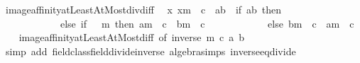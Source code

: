 \begin{isabellebody}
\endisatagproof
{\isafoldproof}%
%
\isadelimproof
\isanewline
%
\endisadelimproof
\isanewline
{}\isamarkupfalse%
\ image{\isacharunderscore}{\kern0pt}affinity{\isacharunderscore}{\kern0pt}atLeastAtMost{\isacharunderscore}{\kern0pt}div{\isacharunderscore}{\kern0pt}diff{\isacharcolon}{\kern0pt}\isanewline
\ \ {\isachardoublequoteopen}{\isacharparenleft}{\kern0pt}{\isacharparenleft}{\kern0pt}{\isasymlambda}x{\isachardot}{\kern0pt}\ x{\isacharslash}{\kern0pt}m\ {\isacharminus}{\kern0pt}\ c{\isacharparenright}{\kern0pt}\ {\isacharbackquote}{\kern0pt}\ {\isacharbraceleft}{\kern0pt}a{\isachardot}{\kern0pt}{\isachardot}{\kern0pt}b{\isacharbraceright}{\kern0pt}{\isacharparenright}{\kern0pt}\ {\isacharequal}{\kern0pt}\ {\isacharparenleft}{\kern0pt}if\ {\isacharbraceleft}{\kern0pt}a{\isachardot}{\kern0pt}{\isachardot}{\kern0pt}b{\isacharbraceright}{\kern0pt}{\isacharequal}{\kern0pt}{\isacharbraceleft}{\kern0pt}{\isacharbraceright}{\kern0pt}\ then\ {\isacharbraceleft}{\kern0pt}{\isacharbraceright}{\kern0pt}\isanewline
\ \ \ \ \ \ \ \ \ \ \ \ else\ if\ {}\ {\isasymle}\ m\ then\ {\isacharbraceleft}{\kern0pt}a{\isacharslash}{\kern0pt}m\ {\isacharminus}{\kern0pt}\ c\ {\isachardot}{\kern0pt}{\isachardot}{\kern0pt}\ b{\isacharslash}{\kern0pt}m\ {\isacharminus}{\kern0pt}\ c{\isacharbraceright}{\kern0pt}\isanewline
\ \ \ \ \ \ \ \ \ \ \ \ else\ {\isacharbraceleft}{\kern0pt}b{\isacharslash}{\kern0pt}m\ {\isacharminus}{\kern0pt}\ c\ {\isachardot}{\kern0pt}{\isachardot}{\kern0pt}\ a{\isacharslash}{\kern0pt}m\ {\isacharminus}{\kern0pt}\ c{\isacharbraceright}{\kern0pt}{\isacharparenright}{\kern0pt}{\isachardoublequoteclose}\isanewline
%
\isadelimproof
\ \ %
\endisadelimproof
%
\isatagproof
{}\isamarkupfalse%
\ image{\isacharunderscore}{\kern0pt}affinity{\isacharunderscore}{\kern0pt}atLeastAtMost{\isacharunderscore}{\kern0pt}diff\ {\isacharbrackleft}{\kern0pt}of\ {\isachardoublequoteopen}inverse\ m{\isachardoublequoteclose}\ c\ a\ b{\isacharbrackright}{\kern0pt}\isanewline
\ \ \isamarkupfalse%
\ {\isacharparenleft}{\kern0pt}simp\ add{\isacharcolon}{\kern0pt}\ field{\isacharunderscore}{\kern0pt}class{\isachardot}{\kern0pt}field{\isacharunderscore}{\kern0pt}divide{\isacharunderscore}{\kern0pt}inverse\ algebra{\isacharunderscore}{\kern0pt}simps\ inverse{\isacharunderscore}{\kern0pt}eq{\isacharunderscore}{\kern0pt}divide{\isacharparenright}{\kern0pt}%
\endisatagproof
{\isafoldproof}%
%
\isadelimproof
\isanewline
%
\endisadelimproof
\isanewline
{}\isamarkupfalse%
\isanewline
\isanewline
{}\isamarkupfalse%

\end{isabellebody}
